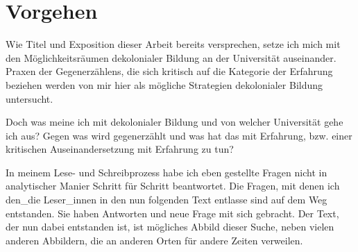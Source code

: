 \section{Vorgehen}

Wie Titel und Exposition dieser Arbeit bereits versprechen, setze ich mich mit
den Möglichkeitsräumen dekolonialer Bildung an der Universität auseinander.
Praxen der Gegenerzählens, die sich kritisch auf die Kategorie der Erfahrung
beziehen werden von mir hier als mögliche Strategien dekolonialer Bildung
untersucht.

Doch was meine ich mit dekolonialer Bildung und von welcher Universität gehe
ich aus? Gegen was wird gegenerzählt und was hat das mit Erfahrung, bzw. einer
kritischen Auseinandersetzung mit Erfahrung zu tun?

In meinem Lese- und Schreibprozess habe ich eben gestellte Fragen nicht in
analytischer Manier Schritt für Schritt beantwortet. Die Fragen, mit denen ich
den\_die Leser\_innen in den nun folgenden Text entlasse sind auf dem Weg
entstanden. Sie haben Antworten und neue Frage mit sich gebracht. Der Text, der
nun dabei entstanden ist, ist mögliches Abbild dieser Suche, neben vielen
anderen Abbildern, die an anderen Orten für andere Zeiten verweilen.

